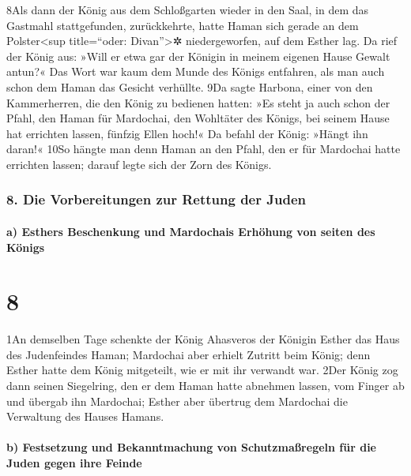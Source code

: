 8Als dann der König aus dem Schloßgarten wieder in den Saal, in dem das
Gastmahl stattgefunden, zurückkehrte, hatte Haman sich gerade an dem
Polster\textless sup title=``oder: Divan''\textgreater✲ niedergeworfen,
auf dem Esther lag. Da rief der König aus: »Will er etwa gar der Königin
in meinem eigenen Hause Gewalt antun?« Das Wort war kaum dem Munde des
Königs entfahren, als man auch schon dem Haman das Gesicht verhüllte.
9Da sagte Harbona, einer von den Kammerherren, die den König zu bedienen
hatten: »Es steht ja auch schon der Pfahl, den Haman für Mardochai, den
Wohltäter des Königs, bei seinem Hause hat errichten lassen, fünfzig
Ellen hoch!« Da befahl der König: »Hängt ihn daran!« 10So hängte man
denn Haman an den Pfahl, den er für Mardochai hatte errichten lassen;
darauf legte sich der Zorn des Königs.

\hypertarget{die-vorbereitungen-zur-rettung-der-juden}{%
\subsubsection{8. Die Vorbereitungen zur Rettung der
Juden}\label{die-vorbereitungen-zur-rettung-der-juden}}

\hypertarget{a-esthers-beschenkung-und-mardochais-erhuxf6hung-von-seiten-des-kuxf6nigs}{%
\paragraph{a) Esthers Beschenkung und Mardochais Erhöhung von seiten des
Königs}\label{a-esthers-beschenkung-und-mardochais-erhuxf6hung-von-seiten-des-kuxf6nigs}}

\hypertarget{section-7}{%
\section{8}\label{section-7}}

1An demselben Tage schenkte der König Ahasveros der Königin Esther das
Haus des Judenfeindes Haman; Mardochai aber erhielt Zutritt beim König;
denn Esther hatte dem König mitgeteilt, wie er mit ihr verwandt war.
2Der König zog dann seinen Siegelring, den er dem Haman hatte abnehmen
lassen, vom Finger ab und übergab ihn Mardochai; Esther aber übertrug
dem Mardochai die Verwaltung des Hauses Hamans.

\hypertarget{b-festsetzung-und-bekanntmachung-von-schutzmauxdfregeln-fuxfcr-die-juden-gegen-ihre-feinde}{%
\paragraph{b) Festsetzung und Bekanntmachung von Schutzmaßregeln für die
Juden gegen ihre
Feinde}\label{b-festsetzung-und-bekanntmachung-von-schutzmauxdfregeln-fuxfcr-die-juden-gegen-ihre-feinde}}

